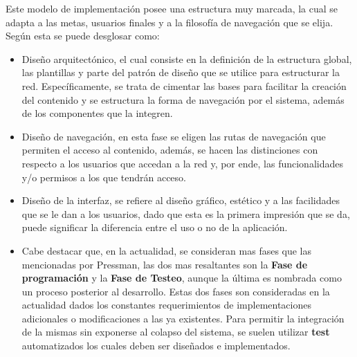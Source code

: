 Este modelo de implementación posee una estructura muy marcada, la cual se adapta
a las metas, usuarios finales y a la filosofía de navegación que se elija.
Según \textcite{pressman2002} esta se puede desglosar como:

\begin{itemize}
    \item Diseño arquitectónico, el cual consiste en la definición de la
        estructura global, las plantillas y parte del patrón de diseño que se
        utilice para estructurar la red. Específicamente, se trata de cimentar
        las bases para facilitar la creación del contenido y se estructura la
        forma de navegación por el sistema, además de los componentes que la
        integren.

    \item Diseño de navegación, en esta fase se eligen las rutas de navegación
        que permiten el acceso al contenido, además, se hacen las distinciones
        con respecto a los  usuarios que accedan a la red y,
        por ende, las funcionalidades y/o permisos a los que tendrán acceso.

    \item Diseño de la interfaz, se refiere al diseño gráfico, estético y a
        las facilidades que se le dan a los usuarios, dado que esta es la primera
        impresión que se da, puede significar la diferencia entre el uso o no de
        la aplicación.

    \item Cabe destacar que, en la actualidad, se consideran mas fases que las
        mencionadas por Pressman, las dos mas resaltantes son la
        \textbf{Fase de programación} y la \textbf{Fase de Testeo}, aunque la
        última es nombrada como un proceso posterior al desarrollo. Estas dos
        fases son consideradas en la actualidad dados los constantes requerimientos
        de implementaciones adicionales o modificaciones a las ya existentes.
        Para permitir la integración de la mismas sin exponerse al colapso del
        sistema, se suelen utilizar \textbf{test} automatizados los cuales deben
        ser diseñados e implementados.

\end{itemize}
